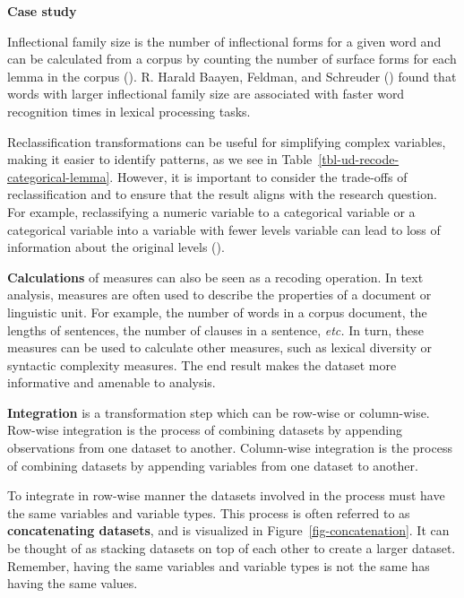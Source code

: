 \documentclass[
  letterpaper,
]{latex/krantz}
\theoremstyle{definition}
\theoremstyle{remark}
\begin{document}
\begin{tcolorbox}[enhanced jigsaw, colframe=quarto-callout-color-frame, breakable, bottomrule=.15mm, arc=.35mm, left=2mm, opacityback=0, rightrule=.15mm, colback=white, toprule=.15mm, leftrule=.75mm]

\textbf{ Case study}

Inflectional family size is the number of inflectional forms for a given
word and can be calculated from a corpus by counting the number of
surface forms for each lemma in the corpus
(). R.
Harald Baayen, Feldman, and Schreuder ()
found that words with larger inflectional family size are associated
with faster word recognition times in lexical processing tasks.

\end{tcolorbox}

Reclassification transformations can be useful for simplifying complex
variables, making it easier to identify patterns, as we see in
Table~\ref{tbl-ud-recode-categorical-lemma}. However, it is important to
consider the trade-offs of reclassification and to ensure that the
result aligns with the research question. For example, reclassifying a
numeric variable to a categorical variable or a categorical variable
into a variable with fewer levels variable can lead to loss of
information about the original levels ().

\textbf{Calculations} of measures can also be seen as a recoding
operation. In text analysis, measures are often used to describe the
properties of a document or linguistic unit. For example, the number of
words in a corpus document, the lengths of sentences, the number of
clauses in a sentence, \emph{etc.} In turn, these measures can be used
to calculate other measures, such as lexical diversity or syntactic
complexity measures. The end result makes the dataset more informative
and amenable to analysis.

\textbf{Integration} is a transformation step which can be row-wise or
column-wise. Row-wise integration is the process of combining datasets
by appending observations from one dataset to another. Column-wise
integration is the process of combining datasets by appending variables
from one dataset to another.

To integrate in row-wise manner the datasets involved in the process
must have the same variables and variable types. This process is often
referred to as \textbf{concatenating datasets}, and is visualized in
Figure~\ref{fig-concatenation}. It can be thought of as stacking
datasets on top of each other to create a larger dataset. Remember,
having the same variables and variable types is not the same has having
the same values.
\end{document}
